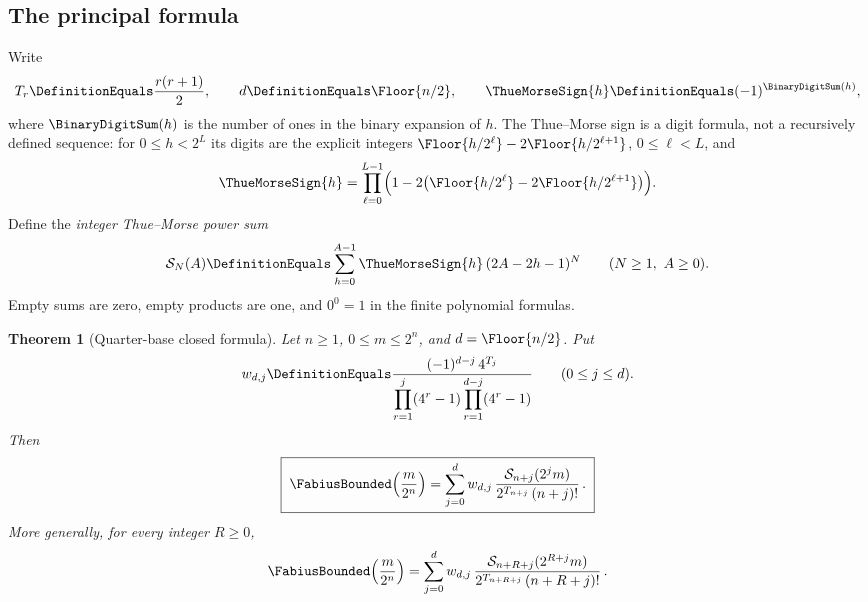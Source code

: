 \documentclass[11pt,oneside]{article}
\theoremstyle{plain}
\newtheorem{theorem}{Theorem}[section]
\theoremstyle{definition}
\theoremstyle{remark}
\newcommand{\Fb}{\FabiusBounded}            %
\newcommand{\tm}[1]{\ThueMorseSign{#1}}     %
\newcommand{\Spow}[2]{\mathcal{S}_{#1}(#2)} %
\newcommand{\Tr}[1]{T_{#1}}                 %
\begin{document}
\subsection{The principal formula}
\label{rf:sec:intro-principal}

Write
\begin{equation}
 \Tr{r}\DefinitionEquals\frac{r(r+1)}{2},\qquad
 d\DefinitionEquals\Floor{n/2},\qquad
 \tm{h}\DefinitionEquals(-1)^{\BinaryDigitSum(h)},
 \label{rf:eq:intro-notation}
\end{equation}
where $\BinaryDigitSum(h)$ is the number of ones in the binary expansion of
$h$.  The Thue--Morse sign is a digit formula, not a recursively defined
sequence: for $0\le h<2^{L}$ its digits are the explicit integers
$\Floor{h/2^{\ell}}-2\Floor{h/2^{\ell+1}}$, $0\le\ell<L$, and
\begin{equation}
 \tm{h}=\prod_{\ell=0}^{L-1}
 \Bigl(1-2\bigl(\Floor{h/2^{\ell}}-2\Floor{h/2^{\ell+1}}\bigr)\Bigr).
 \label{rf:eq:intro-tm-digits}
\end{equation}
Define the \emph{integer Thue--Morse power sum}
\begin{equation}
 \Spow{N}{A}\DefinitionEquals\sum_{h=0}^{A-1}\tm{h}\,(2A-2h-1)^{N}
 \qquad(N\ge1,\ A\ge0).
 \label{rf:eq:intro-power-sum}
\end{equation}
Empty sums are zero, empty products are one, and $0^{0}=1$ in the finite
polynomial formulas.

\begin{theorem}[Quarter-base closed formula]
\label{rf:thm:main-quarter}
Let $n\ge1$, $0\le m\le2^{n}$, and $d=\Floor{n/2}$.  Put
\begin{equation}
 w_{d,j}\DefinitionEquals
 \frac{(-1)^{d-j}\,4^{\Tr{j}}}
      {\displaystyle\prod_{r=1}^{j}(4^{r}-1)\prod_{r=1}^{d-j}(4^{r}-1)}
 \qquad(0\le j\le d).
 \label{rf:eq:main-weights-integer}
\end{equation}
Then
\begin{equation}
 \boxed{\;
 \Fb\!\left(\frac{m}{2^{n}}\right)
 =\sum_{j=0}^{d}w_{d,j}\,
   \frac{\Spow{n+j}{2^{j}m}}{2^{\Tr{n+j}}\,(n+j)!}\,.\;}
 \label{rf:eq:main-quarter}
\end{equation}
More generally, for every integer $R\ge0$,
\begin{equation}
 \Fb\!\left(\frac{m}{2^{n}}\right)
 =\sum_{j=0}^{d}w_{d,j}\,
   \frac{\Spow{n+R+j}{2^{R+j}m}}{2^{\Tr{n+R+j}}\,(n+R+j)!}\,.
 \label{rf:eq:main-quarter-shift}
\end{equation}
\end{theorem}
\end{document}
